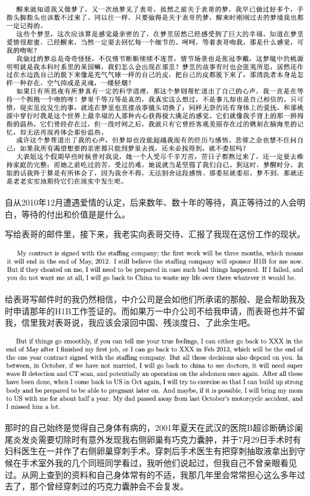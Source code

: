 \documentclass[9pt, b5paper]{article}
\begin{document}
\begin{center}
\includegraphics[width=.9\linewidth]{./pic/p4p19.png}
\end{center}

自从2010年12月遭遇爱情的认定，后来数年、数十年的等待，真正等待过的人会明白，等待的付出和价值是是什么。

写给表哥的邮件里，接下来，我老实向表哥交待、汇报了我现在这份工作的现状。 

\begin{center}
\includegraphics[width=.9\linewidth]{./pic/p1p116-6.png}
\end{center}

给表哥写邮件时的我仍然相信，中介公司是会如他们所承诺的那般、是会帮助我及时申请那年的H1B工作签证的。而如果万一中介公司不给我申请，而表哥也并不留我，信里我对表哥说，我应该会滚回中国、残淡度日、了此余生吧。

\begin{center}
\includegraphics[width=.9\linewidth]{./pic/p1p116-7.png}
\end{center}

那时的自己始终是觉得自己身体有病的，2001年夏天在武汉的医院B超诊断确诊阑尾炎发炎需要切除时有意外发现我右侧卵巢有巧克力囊肿，并于7月29日手术时有妇科医生在一并作了右侧卵巢穿刺手术。穿刺后手术医生有把穿刺抽取液拿出到守候在手术室外我的几个同班同学看过，我听他们说起过，但我自己不曾亲眼看见过。从网上查到的资料和自己身体常有的不适，我那几年里会常常担心这么多年过去了，那个曾经穿刺过的巧克力囊肿会不会复发。
\end{document}
